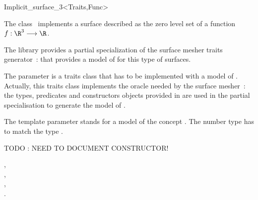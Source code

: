 

\begin{ccRefClass}{Implicit_surface_3<Traits,Func>}


\ccDefinition
  
The class \ccRefName\  implements a surface described 
as the zero level
set  of a function \begin{math}f : \R^3 \longrightarrow \R\end{math}.


The library provides a partial specialization
of the  surface mesher traits generator~:
that provides a model of  for this type of surfaces.


The parameter  is a traits class 
that has to be implemented with a model of 
.
Actually, this traits class implements the oracle needed by the
surface mesher~:
the types, predicates and constructors objects provided
in  are
used in 
the partial specialisation 
to generate the model of  .

The template parameter   stands for a model
of the concept .
The number type  has to match
the type .

TODO : NEED TO DOCUMENT CONSTRUCTOR!


\ccSeeAlso
{},\\
,\\
, \\
.

\end{ccRefClass}


